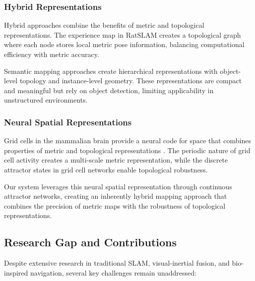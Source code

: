 \subsubsection{Hybrid Representations}

Hybrid approaches combine the benefits of metric and topological representations.
The experience map in RatSLAM \cite{Milford2008} creates a topological graph where each node stores local metric pose information, balancing computational efficiency with metric accuracy.

Semantic mapping approaches \cite{Salas2013, McCormac2017} create hierarchical representations with object-level topology and instance-level geometry.
These representations are compact and meaningful but rely on object detection, limiting applicability in unstructured environments.

\subsubsection{Neural Spatial Representations}

Grid cells in the mammalian brain provide a neural code for space that combines properties of metric and topological representations \cite{Hafting2005, Moser2017}.
The periodic nature of grid cell activity creates a multi-scale metric representation, while the discrete attractor states in grid cell networks enable topological robustness.

Our system leverages this neural spatial representation through continuous attractor networks, creating an inherently hybrid mapping approach that combines the precision of metric maps with the robustness of topological representations.


\subsection{Research Gap and Contributions}

Despite extensive research in traditional SLAM, visual-inertial fusion, and bio-inspired navigation, several key challenges remain unaddressed:

